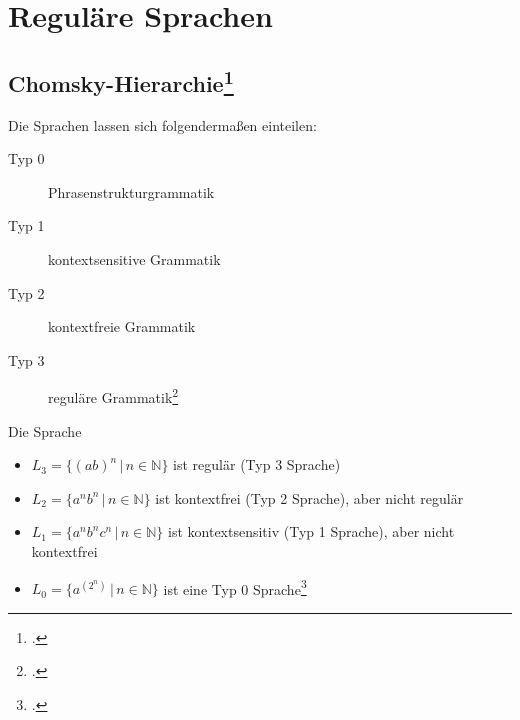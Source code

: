 \documentclass{lehramt-informatik-haupt}
\begin{document}

\chapter{Reguläre Sprachen}

\section{Chomsky-Hierarchie\footcite{wiki:chomsky}}

Die Sprachen lassen sich folgendermaßen einteilen:

\begin{description}
\item[Typ 0] Phrasenstrukturgrammatik
\item[Typ 1] kontextsensitive Grammatik
\item[Typ 2] kontextfreie Grammatik
\item[Typ 3] reguläre Grammatik\footcite[Seite 14]{theo:fs:1}
\end{description}


%

\noindent
Die Sprache

\begin{itemize}
\item $L_3 = \{(ab)^n \, | \, n \in \mathbb{N}\}$
ist regulär (Typ 3 Sprache)

\item $L_2 = \{a^n b^n \, | \, n \in \mathbb{N}\}$
ist kontextfrei (Typ 2 Sprache), aber nicht regulär

\item $L_1 = \{a^n b^n c^n \, | \, n \in \mathbb{N}\}$
ist kontextsensitiv (Typ 1 Sprache), aber nicht kontextfrei

\item $L_0 = \{a^{(2^n)}\, | \, n \in \mathbb{N}\}$
ist eine Typ 0 Sprache\footcite[Seite 15]{theo:fs:1}
\end{itemize}
\end{document}
